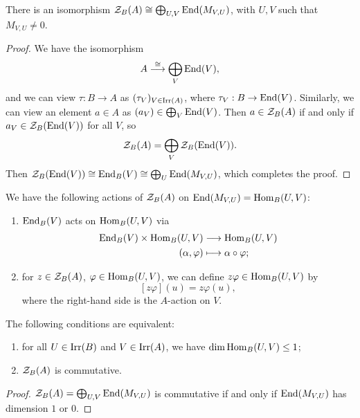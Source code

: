 \begin{lemma}
  There is an isomorphism
  $\mathcal{Z}_B(A) \cong \bigoplus_{U, V} \operatorname{End}(M_{V, U})$,
  with $U, V$ such that $M_{V, U} \ne 0$.
\end{lemma}

\begin{proof}
  We have the isomorphism
  \[
    A \overset{\cong}{\longrightarrow}
    \bigoplus_V \operatorname{End}(V),
  \]
  and we can view $\tau : B \to A$ as
  $(\tau_V)_{V \in \operatorname{Irr}(A)}$, where
  $\tau_V : B \to \operatorname{End}(V)$. Similarly,
  we can
  view an element $a \in A$ as $(a_V) \in \bigoplus_V \operatorname{End}(V)$.
  Then $a \in \mathcal{Z}_B(A)$ if and only if
  $a_V \in \mathcal{Z}_B(\operatorname{End}(V))$ for all $V$, so
  \[
    \mathcal{Z}_B(A)
    = \bigoplus_V \mathcal{Z}_B(\operatorname{End}(V)).
  \]
  Then
  $\mathcal{Z}_B(\operatorname{End}(V)) \cong \operatorname{End}_B(V) \cong \bigoplus_U \operatorname{End}(M_{V, U})$,
  which completes the proof.
\end{proof}

\begin{remark}
  We have the following actions of
  $\mathcal{Z}_B(A)$ on
  $\operatorname{End}(M_{V, U}) = \operatorname{Hom}_B(U, V)$:
  \begin{enumerate}
    \item $\operatorname{End}_B(V)$ acts on
      $\operatorname{Hom}_B(U, V)$ via
      \begin{align*}
        \operatorname{End}_B(V) \times \operatorname{Hom}_B(U, V)
        &\longrightarrow \operatorname{Hom}_B(U, V) \\
        (\alpha, \varphi) &\longmapsto \alpha \circ \varphi;
      \end{align*}
    \item for $z \in \mathcal{Z}_B(A)$,
      $\varphi \in \operatorname{Hom}_B(U, V)$,
      we can define $z \varphi \in \operatorname{Hom}_B(U, V)$
      by
      \[
        [z \varphi](u) = z \varphi(u),
      \]
      where the right-hand side is
      the $A$-action on $V$.
  \end{enumerate}
\end{remark}

\begin{corollary}
  The following conditions are equivalent:
  \begin{enumerate}
    \item for all $U \in \operatorname{Irr}(B)$
      and $V \in \operatorname{Irr}(A)$, we have
      $\dim \operatorname{Hom}_B(U, V) \le 1$;
    \item $\mathcal{Z}_B(A)$ is commutative.
  \end{enumerate}
\end{corollary}

\begin{proof}
  $\mathcal{Z}_B(A) = \bigoplus_{U, V} \operatorname{End}(M_{V, U})$ is
  commutative if and only if
  $\operatorname{End}(M_{V, U})$ has dimension
  $1$ or $0$.
\end{proof}

